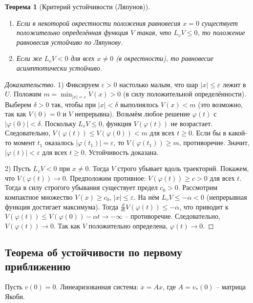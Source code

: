 \documentclass[a4paper,12pt]{article}
\newtheorem{theorem}{Теорема}
\theoremstyle{definition}
\begin{document}
\begin{theorem}[Критерий устойчивости (Ляпунов)]
	\begin{enumerate}
		\item Если в некоторой окрестности положения равновесия $x=0$ существует положительно определённая функция $V$ такая, что $L_v V\le 0$, то положение равновесия устойчиво по Ляпунову.
		\item Если же $L_v V <0$ для всех $x\neq0$ (в окрестности), то равновесие асимптотически устойчиво.
	\end{enumerate}
\end{theorem}
\begin{proof}[Доказательство]
	1) Фиксируем $\varepsilon>0$ настолько малым, что шар $|x|\le\varepsilon$ лежит в $U$. Положим $m=\min_{|x|=\varepsilon} V(x)>0$ (в силу положительной определённости). Выберем $\delta>0$ так, чтобы при $|x|<\delta$ выполнялось $V(x)<m$ (это возможно, так как $V(0)=0$ и $V$ непрерывна). Возьмём любое решение $\varphi(t)$ с $|\varphi(0)|<\delta$. Поскольку $L_v V\le 0$, функция $V(\varphi(t))$ не возрастает. Следовательно, $V(\varphi(t))\le V(\varphi(0))<m$ для всех $t\ge0$. Если бы в какой-то момент $t_1$ оказалось $|\varphi(t_1)|=\varepsilon$, то $V(\varphi(t_1))\ge m$, противоречие. Значит, $|\varphi(t)|<\varepsilon$ для всех $t\ge0$. Устойчивость доказана.
	
	2) Пусть $L_v V<0$ при $x\neq0$. Тогда $V$ строго убывает вдоль траекторий. Покажем, что $V(\varphi(t))\to0$. Предположим противное: $V(\varphi(t))\ge c>0$ для всех $t$. Тогда в силу строгого убывания существует предел $c_0>0$. Рассмотрим компактное множество $V(x)\ge c_0$, $|x|\le\varepsilon$. На нём $L_v V\le -\alpha<0$ (непрерывная функция достигает максимума). Тогда $\frac{d}{dt}V(\varphi(t))\le -\alpha$, что приводит к $V(\varphi(t))\le V(\varphi(0))-\alpha t\to -\infty$ – противоречие. Следовательно, $V(\varphi(t))\to0$. Так как $V$ положительно определена, $\varphi(t)\to0$.
\end{proof}

\subsection{Теорема об устойчивости по первому приближению}

Пусть $v(0)=0$. Линеаризованная система: $\dot{x}=Ax$, где $A=v_*(0)$ – матрица Якоби.
\end{document}
